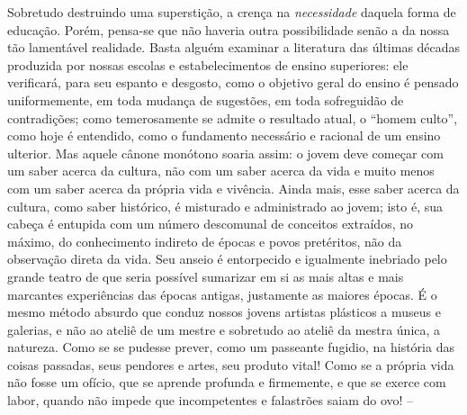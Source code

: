 \begin{enumerate}
\begin{enumerate}
    Sobretudo destruindo uma superstição, a crença na \emph{necessidade}
    daquela forma de educação. Porém, pensa-se que não haveria outra
    possibilidade senão a da nossa tão lamentável realidade. Basta
    alguém examinar a literatura das últimas décadas produzida por
    nossas escolas e estabelecimentos de ensino superiores: ele
    verificará, para seu espanto e desgosto, como o objetivo geral do
    ensino é pensado uniformemente, em toda mudança de sugestões, em
    toda sofreguidão de contradições; como temerosamente se admite o
    resultado atual, o ``homem culto'', como hoje é entendido, como o
    fundamento necessário e racional de um ensino ulterior. Mas aquele
    cânone monótono soaria assim: o jovem deve começar com um saber
    acerca da cultura, não com um saber acerca da vida e muito menos com
    um saber acerca da própria vida e vivência. Ainda mais, esse saber
    acerca da cultura, como saber histórico, é misturado e administrado
    ao jovem; isto é, sua cabeça é entupida com um número descomunal de
    conceitos extraídos, no máximo, do conhecimento indireto de épocas e
    povos pretéritos, não da observação direta da vida. Seu anseio é
    entorpecido e igualmente inebriado pelo grande teatro de que seria
    possível sumarizar em si as mais altas e mais marcantes experiências
    das épocas antigas, justamente as maiores épocas. É o mesmo método
    absurdo que conduz nossos jovens artistas plásticos a museus e
    galerias, e não ao ateliê de um mestre e sobretudo ao ateliê da
    mestra única, a natureza. Como se se pudesse prever, como um
    passeante fugidio, na história das coisas passadas, seus pendores e
    artes, seu produto vital! Como se a própria vida não fosse um
    ofício, que se aprende profunda e firmemente, e que se exerce com
    labor, quando não impede que incompetentes e falastrões saiam do
    ovo! --


\end{enumerate}
\end{enumerate}
